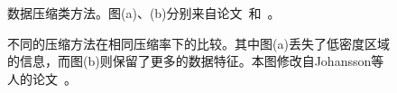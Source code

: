 \documentclass[12pt,twocolumn]{article}
\begin{document}
\begin{figure}[!htb]
\centering
{}
\caption{数据压缩类方法。图(a)、(b)分别来自论文~\citep{ellis2005sampling}和~\citep{palmas2014edge}。}
\end{figure}

\begin{figure}[!htb]
\centering
{}
\caption{\label{fig:PC_Design_Sampling}不同的压缩方法在相同压缩率下的比较。其中图(a)丢失了低密度区域的信息，而图(b)则保留了更多的数据特征。本图修改自Johansson等人的论文~\citep{johansson2008screen}。}
\end{figure}
\end{document}

